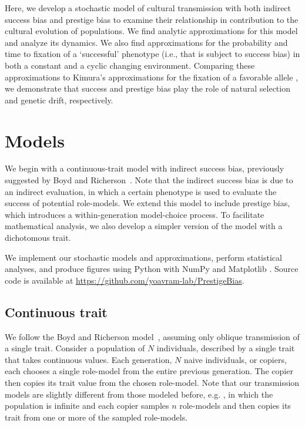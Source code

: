 \documentclass[12pt]{extarticle}
\begin{document}
Here, we develop a stochastic model of cultural transmission with both indirect success bias and prestige bias to examine their relationship in contribution to the cultural evolution of populations.
We find analytic approximations for this model and analyze its dynamics. We also find approximations for the probability and time to fixation of a `successful' phenotype (i.e., that is subject to success bias) in both a constant and a cyclic changing environment.
Comparing these approximations to Kimura's approximations for the fixation of a favorable allele \citep{kimura,kimura_average}, we demonstrate that success and prestige bias play the role of natural selection and genetic drift, respectively. 

\section*{Models}
We begin with a continuous-trait model with indirect success bias, previously suggested by Boyd and Richerson~\citep{evolutionBook}. Note that the indirect success bias is due to an indirect evaluation, in which a certain phenotype is used to evaluate the success of potential role-models.
We extend this model to include prestige bias, which introduces a within-generation model-choice process.
To facilitate mathematical analysis, we also develop a simpler version of the model with a dichotomous trait.

We implement our stochastic models and approximations, perform statistical analyses, and produce figures using Python \citep{python} with NumPy \citep{numpy} and Matplotlib \citep{mathplotlib}. 
Source code is available at \href{https://github.com/yoavram-lab/PrestigeBias}{https://github.com/yoavram-lab/PrestigeBias}.

\subsection*{Continuous trait}
We follow the Boyd and Richerson model~\citep{evolutionBook}, assuming only oblique transmission of a single trait. 
Consider a population of $N$ individuals, described by a single trait that takes continuous values.
Each generation, $N$ naive individuals, or copiers, each chooses a single role-model from the entire previous generation. The copier then copies its trait value from the chosen role-model.
Note that our transmission models are slightly different from those modeled before, e.g. \citep{cumul_culture,Denton2021,evolutionBook}, in which the population is infinite and each copier samples $n$ role-models and then copies its trait from one or more of the sampled role-models.
\end{document}
